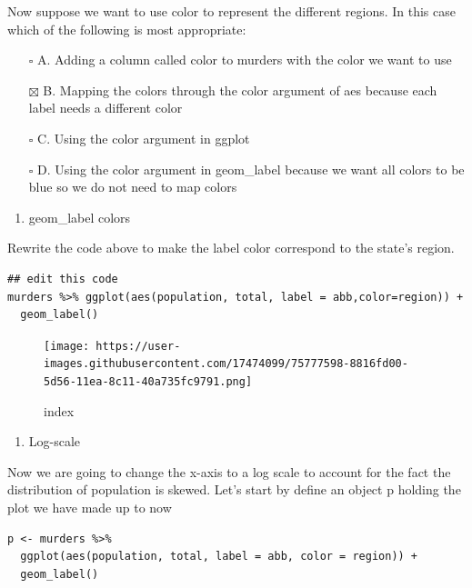 \documentclass[
]{article}
\providecommand{\tightlist}{%
  \setlength{\itemsep}{0pt}\setlength{\parskip}{0pt}}
\begin{document}
Now suppose we want to use color to represent the different regions. In
this case which of the following is most appropriate:

\begin{itemize}
\tightlist
\item[$\square$]
  A. Adding a column called color to murders with the color we want to
  use
\item[$\boxtimes$]
  B. Mapping the colors through the color argument of aes because each
  label needs a different color
\item[$\square$]
  C. Using the color argument in ggplot
\item[$\square$]
  D. Using the color argument in geom\_label because we want all colors
  to be blue so we do not need to map colors
\end{itemize}

\begin{enumerate}
\def\labelenumi{\arabic{enumi}.}
\setcounter{enumi}{11}
\tightlist
\item
  geom\_label colors
\end{enumerate}

Rewrite the code above to make the label color correspond to the state's
region.

\begin{verbatim}
## edit this code
murders %>% ggplot(aes(population, total, label = abb,color=region)) +
  geom_label()
\end{verbatim}

\begin{figure}
\centering
\texttt{[image: https://user-images.githubusercontent.com/17474099/75777598-8816fd00-5d56-11ea-8c11-40a735fc9791.png]}
\caption{index}
\end{figure}

\begin{enumerate}
\def\labelenumi{\arabic{enumi}.}
\setcounter{enumi}{12}
\tightlist
\item
  Log-scale
\end{enumerate}

Now we are going to change the x-axis to a log scale to account for the
fact the distribution of population is skewed. Let's start by define an
object p holding the plot we have made up to now

\begin{verbatim}
p <- murders %>% 
  ggplot(aes(population, total, label = abb, color = region)) +
  geom_label() 
\end{verbatim}
\end{document}
